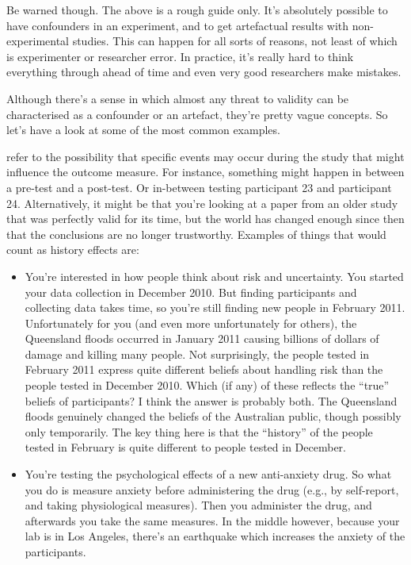 Be warned though. The above is a rough guide only. It's absolutely possible to have confounders in an experiment, and to get artefactual results with non-experimental studies. This can happen for all sorts of reasons, not least of which is experimenter or researcher error. In practice, it's really hard to think everything through ahead of time and even very good researchers make mistakes. 

Although there's a sense in which almost any threat to validity can be characterised as a confounder or an artefact, they're pretty vague concepts. So let's have a look at some of the most common examples.


 refer to the possibility that specific events may occur during the study that might influence the outcome measure. For instance, something might happen in between a pre-test and a post-test. Or in-between testing participant 23 and participant 24. Alternatively, it might be that you're looking at a paper from an older study that was perfectly valid for its time, but the world has changed enough since then that the conclusions are no longer trustworthy. Examples of things that would count as history effects are:

\begin{itemize}
\item You're interested in how people think about risk and uncertainty. You started your data collection in December 2010. But finding participants and collecting data takes time, so you're still finding new people in February 2011. Unfortunately for you (and even more unfortunately for others), the Queensland floods occurred in January 2011 causing billions of dollars of damage and killing many people. Not surprisingly, the people tested in February 2011 express quite different beliefs about handling risk than the people tested in December 2010. Which (if any) of these reflects the ``true'' beliefs of participants? I think the answer is probably both. The Queensland floods genuinely changed the beliefs of the Australian public, though possibly only temporarily. The key thing here is that the ``history'' of the people tested in February is quite different to people tested in December. 
\item You're testing the psychological effects of a new anti-anxiety drug. So what you do is measure anxiety before administering the drug (e.g., by self-report, and taking physiological measures). Then you administer the drug, and afterwards you take the same measures. In the middle however, because your lab is in Los Angeles, there's an earthquake which increases the anxiety of the participants.  
\end{itemize}

